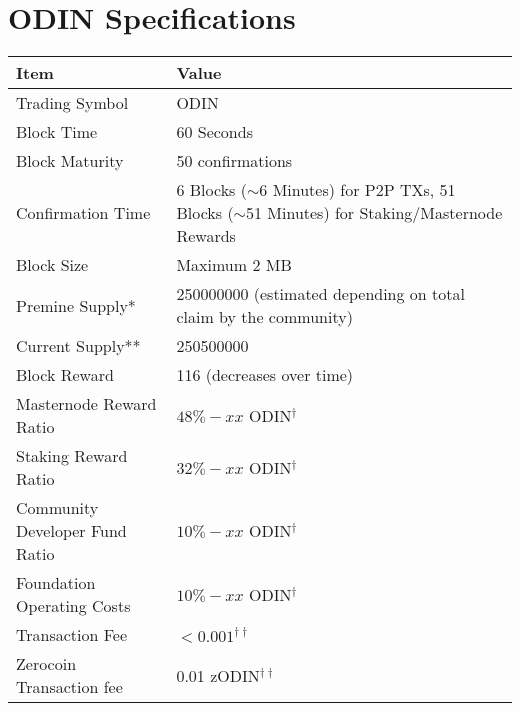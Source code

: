 \documentclass[12pt,letterpaper]{article}
\begin{document}
\section{​ODIN Specifications}\hypertarget{specifications}{}
\begin{center}
\begin{adjustbox}{max width=\textwidth}
\begin{threeparttable}
\renewcommand{\arraystretch}{1.4}
\begin{tabular}{p{6.5cm} p{8cm}}
\hline
Item & Value \\
\hline
\hline
Trading Symbol                          & ODIN                  \\

Block Time                              & 60 Seconds            \\

Block Maturity                          & 50 confirmations      \\

Confirmation Time       & 6 Blocks ($\sim$6 Minutes) for P2P TXs, 51 Blocks ($\sim$51 Minutes) for Staking/Masternode Rewards\\

Block Size              & Maximum 2 MB \\

Premine Supply*          & \num{250000000} (estimated depending on total claim by the community) \tabularnewline

Current Supply**          & \num{250500000} \\

Block Reward            & 116 (decreases over time) \\

Masternode Reward Ratio & $48\% - xx$ ODIN$^\dag$\\

Staking Reward Ratio    & $32\% - xx$ ODIN$^\dag$ \\

Community Developer Fund Ratio & $10\% - xx$ ODIN$^\dag$ \\

Foundation Operating Costs     & $10\% - xx$ ODIN$^\dag$ \\

Transaction Fee         & $< 0.001^{\dag\dag}$ \\

Zerocoin Transaction fee & 0.01 zODIN$^{\dag\dag}$ \\


\end{tabular}
\end{threeparttable}
\end{adjustbox}
\end{center}
\end{document}

